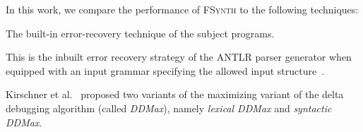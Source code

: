 \documentclass[sigconf,review,anonymous]{acmart}
\newcounter{todocounter}
\newcommand{\todo}[1]{\marginpar{$|$}\textcolor{red}{\stepcounter{todocounter}\footnote[\thetodocounter]{\textcolor{red}{\textbf{TODO }}\textit{#1}}}}
\newcommand{\recheck}[1]{\textcolor{red}{#1}}
\renewcommand{\todo}[1]{}
\newcommand{\ddmin}{\textit{ddmin}\xspace}
\newcommand{\approach}{\textsc{FSynth}\xspace}
\def\ddmin{DDMin\xspace}
\newcommand{\ddmax}{\textit{DDMax}\xspace}
\begin{document}
In this work, we compare the performance of \approach to the following
techniques:
\begin{description}[wide]
\item[Baseline:] The built-in error-recovery technique of the subject programs.
\item[ANTLR:] This is the inbuilt error recovery strategy of the ANTLR parser generator when equipped with an input grammar specifying the allowed input structure~\cite[Automatic Error Recovery Strategy]{parr2013definitive}.

\item[\ddmax:] Kirschner et al.~\cite{kirschner2020debugging} proposed %
two variants of the maximizing variant of the delta debugging algorithm (called \ddmax), %
namely \textit{lexical \ddmax} and \textit{syntactic \ddmax}.
\end{description}

%
%
%
%
\end{document}
